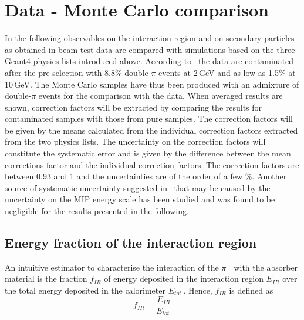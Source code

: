 \section{Data - Monte Carlo comparison}
\label{sec:results}
In the following observables on the interaction region and on secondary particles as obtained in beam test data are compared with simulations based on the three {\sc Geant4} physics lists introduced above. According to~\cite{Bilki:2014uep} the data are contaminated after the pre-selection with 8.8\% double-$\pi$ events at 2\,GeV and as low as 1.5\% at 10\,GeV. The Monte Carlo samples have thus been produced with an admixture of double-$\pi$ events for the comparison with the data. When averaged results are shown, correction factors will be extracted by comparing the results for contaminated samples with those from pure samples.  The correction factors will be given by the means calculated from the individual correction factors extracted from the two physics lists. The uncertainty on the correction factors will constitute the systematic error and is given by the difference between the mean corrections factor and the individual correction factors. The correction factors are between 0.93 and 1 and the uncertainties are of the order of a few \%. Another source of systematic uncertainty suggested in~\cite{Adloff:2013vra} that may be caused by the uncertainty on the MIP energy scale has been studied and was found to be negligible for the results presented in the following.
\subsection{Energy fraction of the interaction region}
An intuitive estimator to characterise the interaction of the $\pi^-$  with the absorber material is the fraction $f_{IR}$ of energy deposited in the interaction region $E_{IR}$ over the total energy deposited in the calorimeter $E_{tot.}$. Hence, $f_{IR}$  is defined as
\begin{equation}
f_{IR} = \frac{E_{IR}}{E_{tot.}}
\end{equation}

